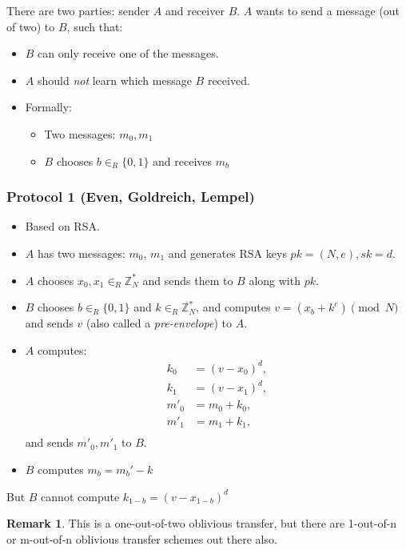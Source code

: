 \documentclass[11pt]{article}
\theoremstyle{definition}
\newtheorem{remark}{Remark}[section]
\theoremstyle{proof}
\begin{document}
There are two parties: sender $A$ and receiver $B$. $A$ wants to send a message (out of two) to $B$, such that:

\begin{itemize}
	\item $B$ can only receive one of the messages.
	\item $A$ should \emph{not} learn which message $B$ received.
	\item Formally:
	\begin{itemize}
		\item Two messages: $m_0, m_1$
		\item $B$ chooses $b \in_R \{0, 1\}$ and receives $m_b$
	\end{itemize}
\end{itemize}

\subsubsection{Protocol 1 (Even, Goldreich, Lempel)}

\begin{itemize}
	\item Based on RSA.
	\item $A$ has two messages: $m_0$, $m_1$ and generates RSA keys $pk = (N, e), sk = d$.
	\item $A$ chooses $x_0, x_1 \in_R \mathbb{Z}_N^*$ and sends them to $B$ along with $pk$.
	\item $B$ chooses $b \in_R \{0, 1\}$ and $k \in_R \mathbb{Z}_N^*$, and computes $v = (x_b + k^e) \pmod{N}$ and sends $v$ (also called a \emph{pre-envelope}) to $A$.
	\item $A$ computes:
	\begin{align}
		k_0 &= (v - x_0)^d, \\
		k_1 &= (v - x_1)^d, \\
		m'_0 &= m_0 + k_0, \\
		m'_1 &= m_1 + k_1, \\
	\end{align}
	and sends $m'_0, m'_1$ to $B$.
	\item $B$ computes $m_b = m_b' - k$
\end{itemize}

But $B$ cannot compute $k_{1-b} = (v - x_{1-b})^d$

\begin{remark}
	This is a one-out-of-two oblivious transfer, but there are 1-out-of-n or m-out-of-n oblivious transfer schemes out there also.
\end{remark}
\end{document}

